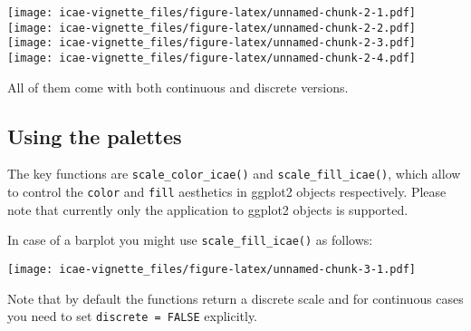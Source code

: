 \documentclass[]{article}
\newenvironment{Shaded}{\begin{snugshade}}{\end{snugshade}}
\newcommand{\KeywordTok}[1]{\textcolor[rgb]{0.13,0.29,0.53}{\textbf{#1}}}
\newcommand{\DataTypeTok}[1]{\textcolor[rgb]{0.13,0.29,0.53}{#1}}
\newcommand{\StringTok}[1]{\textcolor[rgb]{0.31,0.60,0.02}{#1}}
\newcommand{\OperatorTok}[1]{\textcolor[rgb]{0.81,0.36,0.00}{\textbf{#1}}}
\newcommand{\NormalTok}[1]{#1}
\begin{document}
\texttt{[image: icae-vignette\_files/figure-latex/unnamed-chunk-2-1.pdf]}
\texttt{[image: icae-vignette\_files/figure-latex/unnamed-chunk-2-2.pdf]}
\texttt{[image: icae-vignette\_files/figure-latex/unnamed-chunk-2-3.pdf]}
\texttt{[image: icae-vignette\_files/figure-latex/unnamed-chunk-2-4.pdf]}

All of them come with both continuous and discrete versions.

\subsection{Using the palettes}\label{using-the-palettes}

The key functions are \texttt{scale\_color\_icae()} and
\texttt{scale\_fill\_icae()}, which allow to control the \texttt{color}
and \texttt{fill} aesthetics in ggplot2 objects respectively. Please
note that currently only the application to ggplot2 objects is
supported.

In case of a barplot you might use \texttt{scale\_fill\_icae()} as
follows:

\begin{Shaded}
\end{Shaded}

\texttt{[image: icae-vignette\_files/figure-latex/unnamed-chunk-3-1.pdf]}

Note that by default the functions return a discrete scale and for
continuous cases you need to set \texttt{discrete\ =\ FALSE} explicitly.

\begin{Shaded}
\end{Shaded}
\end{document}
